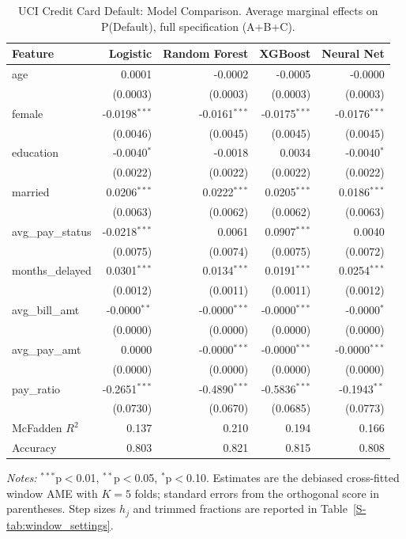 \documentclass[12pt,a4paper]{article}
\numberwithin{equation}{section}
\theoremstyle{plain}
\theoremstyle{definition}
\begin{document}
	\begin{table}[htbp]
		\centering
		\small
		\begin{threeparttable}
			\caption{UCI Credit Card Default: Model Comparison. Average marginal effects on P(Default), full specification (A+B+C).}
			\label{tab:credit_default_model_comparison}
			\begin{tabular}{lrrrr}
				\toprule
				Feature & Logistic & Random Forest & XGBoost & Neural Net \\
				\midrule
				age & 0.0001 & -0.0002 & -0.0005 & -0.0000 \\
				& (0.0003) & (0.0003) & (0.0003) & (0.0003) \\
				female & -0.0198$^{***}$ & -0.0161$^{***}$ & -0.0175$^{***}$ & -0.0176$^{***}$ \\
				& (0.0046) & (0.0045) & (0.0045) & (0.0045) \\
				education & -0.0040$^{*}$ & -0.0018 & 0.0034 & -0.0040$^{*}$ \\
				& (0.0022) & (0.0022) & (0.0022) & (0.0022) \\
				married & 0.0206$^{***}$ & 0.0222$^{***}$ & 0.0205$^{***}$ & 0.0186$^{***}$ \\
				& (0.0063) & (0.0062) & (0.0062) & (0.0063) \\
				\midrule
				avg\_pay\_status & -0.0218$^{***}$ & 0.0061 & 0.0907$^{***}$ & 0.0040 \\
				& (0.0075) & (0.0074) & (0.0075) & (0.0072) \\
				months\_delayed & 0.0301$^{***}$ & 0.0134$^{***}$ & 0.0191$^{***}$ & 0.0254$^{***}$ \\
				& (0.0012) & (0.0011) & (0.0011) & (0.0012) \\
				\midrule
				avg\_bill\_amt & -0.0000$^{**}$ & -0.0000$^{***}$ & -0.0000$^{***}$ & -0.0000$^{*}$ \\
				& (0.0000) & (0.0000) & (0.0000) & (0.0000) \\
				avg\_pay\_amt & 0.0000 & -0.0000$^{***}$ & -0.0000$^{***}$ & -0.0000$^{***}$ \\
				& (0.0000) & (0.0000) & (0.0000) & (0.0000) \\
				pay\_ratio & -0.2651$^{***}$ & -0.4890$^{***}$ & -0.5836$^{***}$ & -0.1943$^{**}$ \\
				& (0.0730) & (0.0670) & (0.0685) & (0.0773) \\
				\midrule
				McFadden $R^2$ & 0.137 & 0.210 & 0.194 & 0.166 \\
				Accuracy & 0.803 & 0.821 & 0.815 & 0.808 \\
				\bottomrule
				\end{tabular}
				\begin{tablenotes}
				\footnotesize
				\item \textit{Notes:} $^{***}$p$<$0.01, $^{**}$p$<$0.05, $^{*}$p$<$0.10. Estimates are the debiased cross-fitted window AME with $K=5$ folds; standard errors from the orthogonal score in parentheses. Step sizes $h_j$ and trimmed fractions are reported in Table~\ref{S-tab:window_settings}.
				\end{tablenotes}
		\end{threeparttable}
	\end{table}
	
\end{document}
